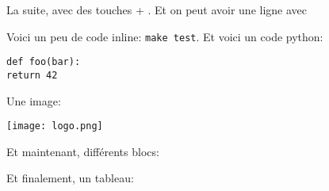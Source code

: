 \documentclass[small]{zmdocument}
\begin{document}
La suite, avec des touches  + . Et on peut avoir une ligne avec

\horizontalLine

Voici un peu de code inline: \verb`make test`. Et voici un code python:

\begin{verbatim}
def foo(bar):
return 42
\end{verbatim}

Une image: 

\begin{center}
\texttt{[image: logo.png]}
\end{center}

Et maintenant, différents blocs:

\begin{Information}
\blindtext
\begin{Question}
\blindtext
\end{Question}
\end{Information}

\begin{Question}
\blindtext
\end{Question}

\begin{Warning}
\blindtext
\end{Warning}

\begin{Error}
\blindtext
\end{Error}

Et finalement, un tableau:
\end{document}
